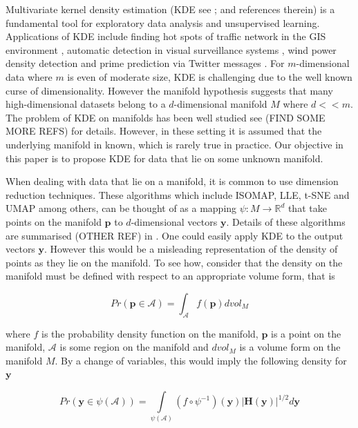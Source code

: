 \documentclass[11pt,a4paper,]{article}
\begin{document}
Multivariate kernel density estimation (KDE see \textcite{Parzen1962-gt}; \textcite{Chen2017-dw} and references therein) is a fundamental tool for exploratory data analysis and unsupervised learning. Applications of KDE include finding hot spots of traffic network in the GIS environment \autocite{Xie2008-eb,Okabe2009-nb}, automatic detection in visual surveillance systems \autocite{Elgammal2002-cw}, wind power density detection \autocite{Jeon2012-ac} and prime prediction via Twitter messages \autocite{Gerber2014-tq}. For \(m\)-dimensional data where \(m\) is even of moderate size, KDE is challenging due to the well known curse of dimensionality. However the manifold hypothesis suggests that many high-dimensional datasets belong to a \(d\)-dimensional manifold \(M\) where \(d<<m\). The problem of KDE on manifolds has been well studied see \textcite{Pelletier2005-vu} (FIND SOME MORE REFS) for details. However, in these setting it is assumed that the underlying manifold in known, which is rarely true in practice. Our objective in this paper is to propose KDE for data that lie on some unknown manifold.

When dealing with data that lie on a manifold, it is common to use dimension reduction techniques. These algorithms which include ISOMAP, LLE, t-SNE and UMAP among others, can be thought of as a mapping \(\psi:M\rightarrow \mathbb{R}^d\) that take points on the manifold \(\pmb{p}\) to \(d\)-dimensional vectors \(\pmb{y}\). Details of these algorithms are summarised (OTHER REF) in \textcite{Cheng2021-dh}. One could easily apply KDE to the output vectors \(\pmb{y}\). However this would be a misleading representation of the density of points as they lie on the manifold. To see how, consider that the density on the manifold must be defined with respect to an appropriate volume form, that is

\[Pr(\pmb{p}\in\mathcal{A})=\int_\mathcal{A} f(\pmb{p}) dvol_M\]

where \(f\) is the probability density function on the manifold, \(\pmb{p}\) is a point on the manifold, \(\mathcal{A}\) is some region on the manifold and \(dvol_M\) is a volume form on the manifold \(M\). By a change of variables, this would imply the following density for \(\pmb{y}\)

\begin{equation}
\label{eq:changevar}
Pr(\pmb{y}\in\psi(\mathcal{A}))=\int\limits_{\psi(\mathcal{A})} (f\circ\psi^{-1})(\pmb{y})|\pmb{H}(\pmb{y})|^{1/2}d\pmb{y}
\end{equation}
\end{document}

